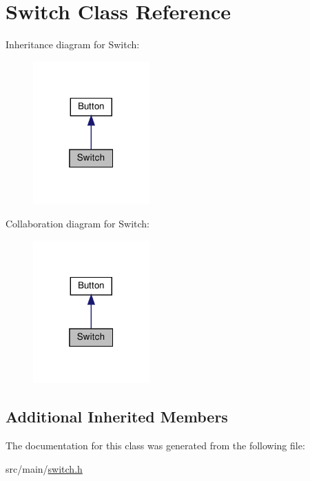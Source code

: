 \hypertarget{class_switch}{}\section{Switch Class Reference}
\label{class_switch}


Inheritance diagram for Switch\+:
\nopagebreak
\begin{figure}[H]
\begin{center}
\leavevmode
\includegraphics[width=127pt]{class_switch__inherit__graph}
\end{center}
\end{figure}


Collaboration diagram for Switch\+:
\nopagebreak
\begin{figure}[H]
\begin{center}
\leavevmode
\includegraphics[width=127pt]{class_switch__coll__graph}
\end{center}
\end{figure}
\subsection*{Additional Inherited Members}


The documentation for this class was generated from the following file\+:\begin{DoxyCompactItemize}
\item 
src/main/\hyperlink{switch_8h}{switch.\+h}\end{DoxyCompactItemize}
